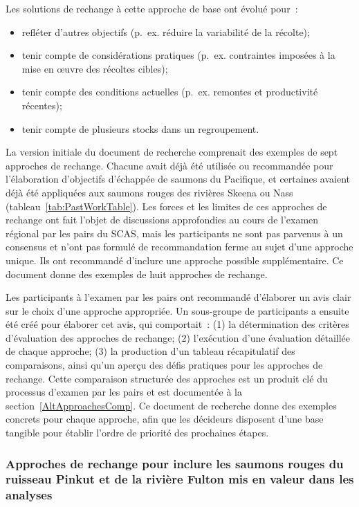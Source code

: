 \documentclass[french,11pt]{book}
\begin{document}
\endgroup{} \endgroup{}

\clearpage

Les solutions de rechange à cette approche de base ont évolué pour~:
\begin{itemize}

\item
  refléter d'autres objectifs (p.~ex. réduire la variabilité de la récolte);
\item
  tenir compte de considérations pratiques (p.~ex. contraintes imposées à la mise en œuvre des récoltes cibles);
\item
  tenir compte des conditions actuelles (p.~ex. remontes et productivité récentes);
\item
  tenir compte de plusieurs stocks dans un regroupement.
\end{itemize}
La version initiale du document de recherche comprenait des exemples de sept approches de rechange. Chacune avait déjà été utilisée ou recommandée pour l'élaboration d'objectifs d'échappée de saumons du Pacifique, et certaines avaient déjà été appliquées aux saumons rouges des rivières Skeena ou Nass (tableau~\ref{tab:PastWorkTable}). Les forces et les limites de ces approches de rechange ont fait l'objet de discussions approfondies au cours de l'examen régional par les pairs du SCAS, mais les participants ne sont pas parvenus à un consensus et n'ont pas formulé de recommandation ferme au sujet d'une approche unique. Ils ont recommandé d'inclure une approche possible supplémentaire. Ce document donne des exemples de huit approches de rechange.

Les participants à l'examen par les pairs ont recommandé d'élaborer un avis clair sur le choix d'une approche appropriée. Un sous-groupe de participants a ensuite été créé pour élaborer cet avis, qui comportait~: (1) la détermination des critères d'évaluation des approches de rechange; (2) l'exécution d'une évaluation détaillée de chaque approche; (3) la production d'un tableau récapitulatif des comparaisons, ainsi qu'un aperçu des défis pratiques pour les approches de rechange. Cette comparaison structurée des approches est un produit clé du processus d'examen par les pairs et est documentée à la section~\ref{AltApproachesComp}. Ce document de recherche donne des exemples concrets pour chaque approche, afin que les décideurs disposent d'une base tangible pour établir l'ordre de priorité des prochaines étapes.

\subsubsection{Approches de rechange pour inclure les saumons rouges du ruisseau Pinkut et de la rivière Fulton mis en valeur dans les analyses}\label{AltApproachEnhanced}
\end{document}
